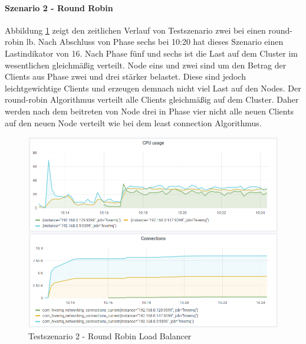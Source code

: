 \paragraph{Szenario 2 - Round Robin}
Abbildung \ref{fig:s2-rr} zeigt den zeitlichen Verlauf von Testszenario zwei bei einen round-robin \ac{lb}.
Nach Abschluss von Phase sechs bei 10:20 hat dieses Szenario einen Lastindikator von 16.
Nach Phase fünf und sechs ist die Last auf dem Cluster im wesentlichen gleichmä{\ss}ig verteilt. Node eins und zwei sind um den Betrag der Clients aus Phase zwei und drei stärker belastet. Diese sind jedoch leichtgewichtige Clients und erzeugen demnach nicht viel Last auf den Nodes.
Der round-robin Algorithmus verteilt alle Clients gleichmä{\ss}ig auf dem Cluster. Daher werden nach dem beitreten von Node drei in Phase vier nicht alle neuen Clients auf den neuen Node verteilt wie bei dem least connection Algorithmus.
\begin{figure}
    \centering
    \includegraphics[scale=0.8]{images/s2_rr.png}
    \caption{Testszenario 2 - Round Robin Load Balancer}
    \label{fig:s2-rr}
\end{figure}

